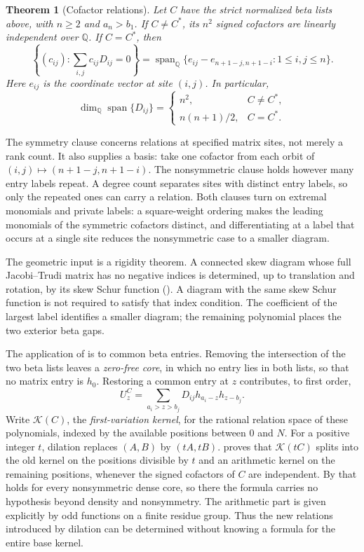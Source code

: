 \documentclass[11pt,a4paper]{amsart}
\numberwithin{equation}{section}
\theoremstyle{plain}
\newtheorem{theorem}{Theorem}[section]
\theoremstyle{definition}
\newcommand{\Q}{\mathbb Q}
\newcommand{\K}{\mathcal K}
\begin{document}
\begin{theorem}[Cofactor relations]\label{thm:cofactor-relations}
Let \(C\) have the strict normalized beta lists above, with \(n\ge2\) and
\(a_n>b_1\).  If \(C\ne C^*\), its \(n^2\) signed cofactors are linearly
independent over \(\Q\).  If \(C=C^*\), then
\[
 \left\{(c_{ij}):\sum_{i,j}c_{ij}D_{ij}=0\right\}
 =\operatorname{span}_{\Q}
 \{e_{ij}-e_{n+1-j,n+1-i}:1\le i,j\le n\}.
\]
Here \(e_{ij}\) is the coordinate vector at site \((i,j)\).  In particular,
\[
 \dim_{\Q}\operatorname{span}\{D_{ij}\}
 =\begin{cases}
 n^2,&C\ne C^*,\\
 n(n+1)/2,&C=C^*.
 \end{cases}
\]
\end{theorem}

The symmetry clause concerns relations at specified matrix sites, not merely
a rank count.  It also supplies a basis: take one cofactor from each orbit of
\((i,j)\mapsto(n+1-j,n+1-i)\).  The nonsymmetric clause holds however
many entry labels repeat.  A degree count separates sites with distinct
entry labels, so only the repeated ones can carry a relation.  Both clauses
turn on extremal monomials and private labels: a square-weight ordering makes
the leading monomials of the symmetric cofactors distinct, and differentiating
at a label that occurs at a single site reduces the nonsymmetric case to a
smaller diagram.

The geometric input is a rigidity theorem.  A connected skew diagram whose
full Jacobi--Trudi matrix has no negative indices is determined, up to
translation and rotation, by its skew Schur function
().  A diagram with the same skew Schur
function is not required to satisfy that index condition.  The coefficient of
the largest label identifies a smaller diagram; the remaining polynomial
places the two exterior beta gaps.

The application of  is to common beta entries.
Removing the intersection of the two beta lists leaves a \emph{zero-free
core}, in which no entry lies in both lists, so that no matrix entry is
\(h_0\).
Restoring a common entry at \(z\) contributes, to first order,
\begin{equation}\label{eq:unit-intro}
 U_z^C=\sum_{a_i>z>b_j}D_{ij}h_{a_i-z}h_{z-b_j}.
\end{equation}
Write \(\K(C)\), the \emph{first-variation kernel}, for the rational relation
space of these polynomials, indexed by the available positions between \(0\)
and \(N\).
For a positive integer \(t\), dilation replaces \((A,B)\) by \((tA,tB)\).
 proves that \(\K(tC)\) splits into the old kernel on the
positions divisible by \(t\) and an arithmetic kernel on the remaining
positions, whenever the signed cofactors of \(C\) are independent.  By
 that holds for every nonsymmetric dense core, so
there the formula carries no hypothesis beyond density and nonsymmetry.  The
arithmetic part is given explicitly by odd functions on a finite residue
group.  Thus the new relations introduced by dilation can be determined
without knowing a formula for the entire base kernel.
\end{document}
